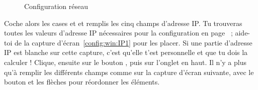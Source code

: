 \noindent
  \begin{figure}[!h]
    \begin{center}  
             \caption{Configuration r\'eseau}
    \end{center}
  \end{figure}



Coche alors les cases  et  et remplis les cinq champs d'adresse IP. Tu trouveras toutes les valeurs d'adresse IP n\'ecessaires pour la configuration en page~\pageref{tableau:mon_IP} ; aide-toi de la capture d'\'ecran~\ref{config:win:IP1} pour les placer. Si une partie d'adresse IP est blanche sur cette capture, c'est qu'elle t'est personnelle et que tu dois la calculer !
Clique, ensuite sur le bouton , puis sur l'onglet
 en haut.
Il n'y a plus qu'\`a  remplir les diff\'erents champs comme sur la
capture d'\'ecran suivante, avec le bouton  et les
fl\`eches pour r\'eordonner les \'el\'ements.


